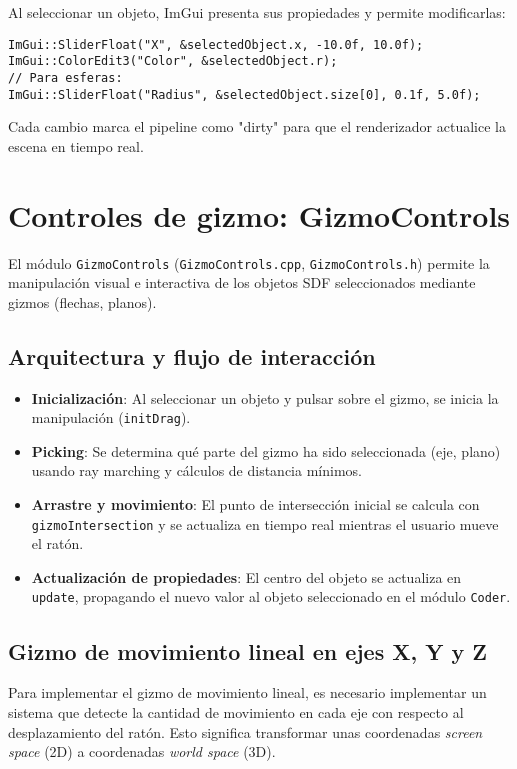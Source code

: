 Al seleccionar un objeto, ImGui presenta sus propiedades y permite
modificarlas:
\begin{verbatim}
ImGui::SliderFloat("X", &selectedObject.x, -10.0f, 10.0f);
ImGui::ColorEdit3("Color", &selectedObject.r);
// Para esferas:
ImGui::SliderFloat("Radius", &selectedObject.size[0], 0.1f, 5.0f);
\end{verbatim}
Cada cambio marca el pipeline como "dirty" para que el renderizador actualice
la escena en tiempo real.

\section{Controles de gizmo: GizmoControls}

El módulo \texttt{GizmoControls} (\texttt{GizmoControls.cpp},
\texttt{GizmoControls.h}) permite la manipulación visual e interactiva de los
objetos SDF seleccionados mediante gizmos (flechas, planos).

\subsection{Arquitectura y flujo de interacción}

\begin{itemize}
    \item \textbf{Inicialización}: Al seleccionar un objeto y pulsar sobre el gizmo, se inicia la manipulación (\texttt{initDrag}).
    \item \textbf{Picking}: Se determina qué parte del gizmo ha sido seleccionada (eje, plano) usando ray marching y cálculos de distancia mínimos.
    \item \textbf{Arrastre y movimiento}: El punto de intersección inicial se calcula con \texttt{gizmoIntersection} y se actualiza en tiempo real mientras el usuario mueve el ratón.
    \item \textbf{Actualización de propiedades}: El centro del objeto se actualiza en \texttt{update}, propagando el nuevo valor al objeto seleccionado en el módulo \texttt{Coder}.
\end{itemize}


\subsection{Gizmo de movimiento lineal en ejes X, Y y Z}

Para implementar el gizmo de movimiento lineal, es necesario implementar un
sistema que detecte la cantidad de movimiento en cada eje con respecto al
desplazamiento del ratón. Esto significa transformar unas coordenadas
\textit{screen space} (2D) a coordenadas \textit{world space} (3D).

